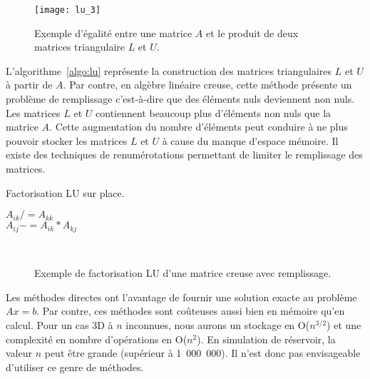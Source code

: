 \begin{figure}[!h]
  \centering
  \texttt{[image: lu\_3]}
  \caption{Exemple d'égalité entre une matrice $A$ et le produit de deux matrices triangulaire $L$ et $U$.}
  \label{fig:lu_3}
\end{figure}


L'algorithme~\ref{algo:lu} représente la construction des matrices triangulaires $L$ et $U$ à partir de $A$.
%
Par contre, en algèbre linéaire creuse, cette méthode présente un problème de remplissage c'est-à-dire que des éléments nuls deviennent non nuls.
%
Les matrices $L$ et $U$ contiennent beaucoup plus d'éléments non nuls que la matrice $A$.
%
Cette augmentation du nombre d'éléments peut conduire à ne plus pouvoir stocker les matrices $L$ et $U$ à cause du manque d'espace mémoire.
%
Il existe des techniques de renumérotations permettant de limiter le remplissage des matrices\cite{ordering_scotch,ordering_metis}.

\begin{algorithm}
  \caption{Factorisation LU sur place.}
  \label{algo:lu}
   {
     {
      $A_{ik} /= A_{kk}$ \\
       {
        $A_{ij} -= A_{ik}*A_{kj}$
      }
    }
  }
\end{algorithm}

\begin{figure}[!h]
     \begin{center}
        ~
    \end{center}
    \caption{Exemple de factorisation LU d'une matrice creuse avec remplissage.}
    \label{fig:lu_example}
\end{figure}

Les méthodes directes ont l'avantage de fournir une solution exacte au problème $Ax=b$.
%
Par contre, ces méthodes sont coûteuses aussi bien en mémoire qu'en calcul.
%
Pour un cas 3D à $n$ inconnues, nous aurons un stockage en O($n^{3/2}$) et une complexité en nombre d'opérations en O($n^2$).
%
En simulation de réservoir, la valeur $n$ peut être grande (supérieur à 1~000~000).
%
Il n'est donc pas envisageable d'utiliser ce genre de méthodes.
